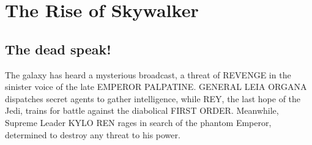 \chapter{The Rise of Skywalker}
\section{The dead speak!}
The galaxy has heard a mysterious broadcast, a threat of 
REVENGE in the sinister voice of the late EMPEROR PALPATINE. 
GENERAL LEIA ORGANA dispatches secret agents to gather 
intelligence, while REY, the last hope of the Jedi, trains 
for battle against the diabolical FIRST ORDER. Meanwhile, 
Supreme Leader KYLO REN rages in search of the phantom 
Emperor, determined to destroy any threat to his power.

\lipsum[1-20]

\cite{POLITZER_1973}
\cite{BARTKE_2009}
\cite{EICHTEN_1980e}
